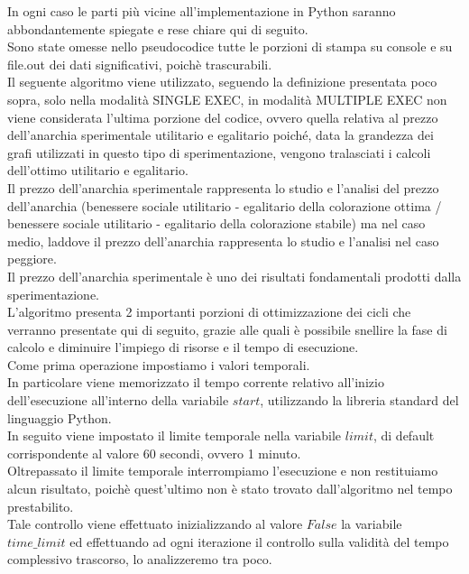 In ogni caso le parti più vicine all'implementazione in Python saranno abbondantemente spiegate e rese chiare qui di seguito.\\

Sono state omesse nello pseudocodice tutte le porzioni di stampa su console e su file.out dei dati significativi, poichè trascurabili.\\

Il seguente algoritmo viene utilizzato, seguendo la definizione presentata poco sopra, solo nella modalità SINGLE EXEC, in modalità MULTIPLE EXEC non viene considerata l'ultima porzione del codice, ovvero quella relativa al prezzo dell'anarchia sperimentale utilitario e egalitario poiché, data la grandezza dei grafi utilizzati in questo tipo di sperimentazione, vengono tralasciati i calcoli dell'ottimo utilitario e egalitario.\\

Il prezzo dell'anarchia sperimentale rappresenta lo studio e l'analisi del prezzo dell'anarchia (benessere sociale utilitario - egalitario della colorazione ottima / benessere sociale utilitario - egalitario della colorazione stabile) ma nel caso medio, laddove il prezzo dell'anarchia rappresenta lo studio e l'analisi nel caso peggiore.\\
Il prezzo dell'anarchia sperimentale è uno dei risultati fondamentali prodotti dalla sperimentazione.\\

L'algoritmo presenta 2 importanti porzioni di ottimizzazione dei cicli che verranno presentate qui di seguito, grazie alle quali è possibile snellire la fase di calcolo e diminuire l'impiego di risorse e il tempo di esecuzione.\\

Come prima operazione impostiamo i valori temporali.\\
In particolare viene memorizzato il tempo corrente relativo all'inizio dell'esecuzione all'interno della variabile $start$, utilizzando la libreria standard del linguaggio Python.\\
In seguito viene impostato il limite temporale nella variabile $limit$, di default corrispondente al valore 60 secondi, ovvero 1 minuto.\\
Oltrepassato il limite temporale interrompiamo l'esecuzione e non restituiamo alcun risultato, poichè quest'ultimo non è stato trovato dall'algoritmo nel tempo prestabilito.\\
Tale controllo viene effettuato inizializzando al valore $False$ la variabile $time\_limit$ ed effettuando ad ogni iterazione il controllo sulla validità del tempo complessivo trascorso, lo analizzeremo tra poco.\\

